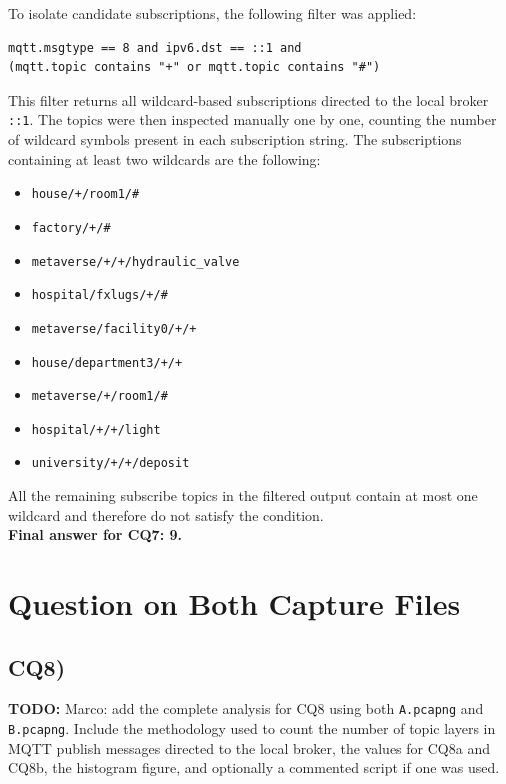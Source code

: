 \documentclass[a4paper,11pt]{article}
\newcommand{\TODO}[1]{
\begin{todobox}
\textbf{TODO:} #1
\end{todobox}
}
\begin{document}
To isolate candidate subscriptions, the following filter was applied:

\begin{lstlisting}
mqtt.msgtype == 8 and ipv6.dst == ::1 and
(mqtt.topic contains "+" or mqtt.topic contains "#")
\end{lstlisting}

This filter returns all wildcard-based subscriptions directed to the local broker
\texttt{::1}. The topics were then inspected manually one by one, counting the number
of wildcard symbols present in each subscription string. The subscriptions containing
at least two wildcards are the following:

\begin{itemize}
    \item \texttt{house/+/room1/\#}
    \item \texttt{factory/+/\#}
    \item \texttt{metaverse/+/+/hydraulic\_valve}
    \item \texttt{hospital/fxlugs/+/\#}
    \item \texttt{metaverse/facility0/+/+}
    \item \texttt{house/department3/+/+}
    \item \texttt{metaverse/+/room1/\#}
    \item \texttt{hospital/+/+/light}
    \item \texttt{university/+/+/deposit}
\end{itemize}

All the remaining subscribe topics in the filtered output contain at most one
wildcard and therefore do not satisfy the condition.\\

\textbf{Final answer for CQ7: 9.}

\section{Question on Both Capture Files}

\subsection{CQ8)}
\TODO{Marco: add the complete analysis for CQ8 using both \texttt{A.pcapng} and \texttt{B.pcapng}. Include the methodology used to count the number of topic layers in MQTT publish messages directed to the local broker, the values for CQ8a and CQ8b, the histogram figure, and optionally a commented script if one was used.}
\end{document}
